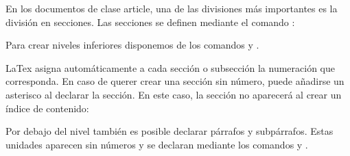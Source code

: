 \documentclass[11pt, a4paper]{article}
\begin{document}
En los documentos de clase article, una de las divisiones más importantes es la división en secciones. Las secciones se definen mediante el comando :

	
Para crear niveles inferiores disponemos de los comandos  y .





		
		\vspace{2mm}




				
				\vspace{2mm}







LaTex asigna automáticamente a cada sección o subsección la numeración que corresponda.
En caso de querer crear una sección sin número, puede añadirse un asterisco al declarar la sección. En este caso, la sección no aparecerá al crear un índice de contenido:


Por debajo del nivel  también es posible declarar párrafos y subpárrafos. Estas unidades aparecen sin números y se declaran mediante los comandos  y .
\end{document}
